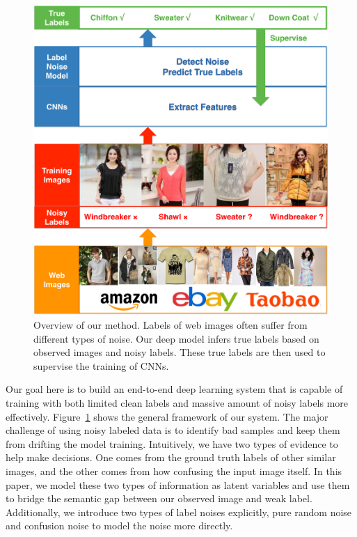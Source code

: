 \documentclass[10pt,twocolumn,letterpaper]{article}
\begin{document}
\begin{figure}[t]
\begin{center}
\includegraphics[width=0.9\linewidth]{figure/overview.pdf}
\end{center}
\caption{Overview of our method. Labels of web images often suffer from different types of noise. Our deep model infers true labels based on observed images and noisy labels. These true labels are then used to supervise the training of CNNs.}
\label{fig:overview}
\end{figure}

Our goal here is to build an end-to-end deep learning system that is capable of training with both limited clean labels and massive amount of noisy labels more effectively. Figure~\ref{fig:overview} shows the general framework of our system. The major challenge of using noisy labeled data is to identify bad samples and keep them from drifting the model training. Intuitively, we have two types of evidence to help make decisions. One comes from the ground truth labels of other similar images, and the other comes from how confusing the input image itself. In this paper, we model these two types of information as latent variables and use them to bridge the semantic gap between our observed image and weak label. Additionally, we introduce two types of label noises explicitly, pure random noise and confusion noise to model the noise more directly. 
\end{document}
